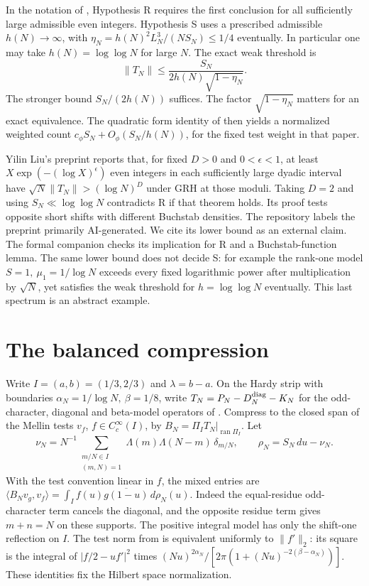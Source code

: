 \documentclass[11pt,a4paper]{article}
\begin{document}
In the notation of \cite[eqs.~(1.7), (2.28), (2.30)]{LL}, Hypothesis R requires the first conclusion for all sufficiently large admissible even integers. Hypothesis S uses a prescribed admissible \(h(N)\to\infty\), with \(\eta_N=h(N)^2L_N^3/(NS_N)\le1/4\) eventually. In particular one may take \(h(N)=\log\log N\) for large \(N\). The exact weak threshold is
\[
 \|T_N\|\le \frac{S_N}{2h(N)\sqrt{1-\eta_N}} .
\]
The stronger bound \(S_N/(2h(N))\) suffices. The factor \(\sqrt{1-\eta_N}\) matters for an exact equivalence. The quadratic form identity of \cite{LL} then yields a normalized weighted count \(c_\phi S_N+O_\phi(S_N/h(N))\), for the fixed test weight in that paper.

Yilin Liu's preprint \cite[Thm.~1.1]{YL} reports that, for fixed \(D>0\) and \(0<\epsilon<1\), at least \(X\exp(-(\log X)^\epsilon)\) even integers in each sufficiently large dyadic interval have \(\sqrt N\|T_N\|>(\log N)^D\) under GRH at those moduli. Taking \(D=2\) and using \(S_N\ll\log\log N\) contradicts R if that theorem holds. Its proof tests opposite short shifts with different Buchstab densities. The repository labels the preprint primarily AI-generated. We cite its lower bound as an external claim. The formal companion checks its implication for R and a Buchstab-function lemma. The same lower bound does not decide S: for example the rank-one model \(S=1,\ \mu_1=1/\log N\) exceeds every fixed logarithmic power after multiplication by \(\sqrt N\), yet satisfies the weak threshold for \(h=\log\log N\) eventually. This last spectrum is an abstract example.

\section{The balanced compression}\label{s:op}
Write \(I=(a,b)=(1/3,2/3)\) and \(\lambda=b-a\). On the Hardy strip with boundaries \(\alpha_N=1/\log N,\ \beta=1/8\), write \(T_N=P_N-D_N^{\rm diag}-K_N\) for the odd-character, diagonal and beta-model operators of \cite[Secs.~5--7]{LL}. Compress to the closed span of the Mellin tests \(v_f\), \(f\in C_c^\infty(I)\), by \(B_N=\Pi_I T_N|_{\operatorname{ran}\Pi_I}\). Let
\[
 \nu_N=N^{-1}\!\sum_{\substack{m/N\in I\\(m,N)=1}}\!
 \Lambda(m)\Lambda(N-m)\,\delta_{m/N},\qquad \rho_N=S_N\,du-\nu_N .
\]
With the test convention linear in \(f\), the mixed entries are
\(\langle B_Nv_g,v_f\rangle=\int_I f(u)\overline{g(1-u)}\,d\rho_N(u)\).
Indeed the equal-residue odd-character term cancels the diagonal, and the opposite residue term gives \(m+n=N\) on these supports. The positive integral model has only the shift-one reflection on \(I\). The test norm from \cite[Prop.~7.4]{LL} is equivalent uniformly to \(\|f'\|_2\): its square is the integral of \(|f/2-uf'|^2\) times \((Nu)^{2\alpha_N}/[2\pi(1+(Nu)^{-2(\beta-\alpha_N)})]\). These identities fix the Hilbert space normalization.
\end{document}
